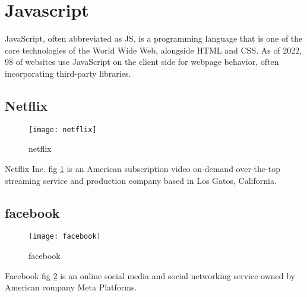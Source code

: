\documentclass[12 pt]{article}
\begin{document}
\section{Javascript}
JavaScript, often abbreviated as JS, is a programming language that is one of the core technologies of the World Wide Web, alongside HTML and CSS. As of 2022, 98 of websites use JavaScript on the client side for webpage behavior, often incorporating third-party libraries.

\subsection{Netflix}
\begin{figure}[h]
\centering
\texttt{[image: netflix]}
\caption{netflix}
\label{fig1:netflix}
\end{figure}
Netflix Inc. fig \ref{fig1:netflix}  is an American subscription video on-demand over-the-top streaming service and production company based in Los Gatos, California.

\subsection{facebook}
\begin{figure}[h]
\centering
\texttt{[image: facebook]}
\caption{facebook}
\label{fig1:facebook}
\end{figure}
Facebook fig \ref{fig1:facebook} is an online social media and social networking service owned by American company Meta Platforms.
\end{document}
